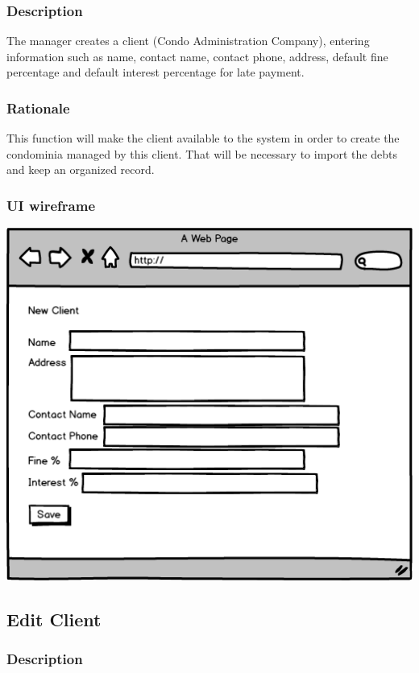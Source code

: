 \documentclass{scrreprt}
\begin{document}
\subsubsection{Description}

The manager creates a client (Condo Administration Company), entering information such as name, contact name, contact phone, address, default fine percentage and default interest percentage for late payment.

\subsubsection{Rationale}

This function will make the client available to the system in order to create the condominia managed by this client. That will be necessary to import the debts and keep an organized record.

\subsubsection{UI wireframe}
\includegraphics[scale=0.60]{mockups/createclient.png}

\subsection{Edit Client}
\subsubsection{Description}
\end{document}
